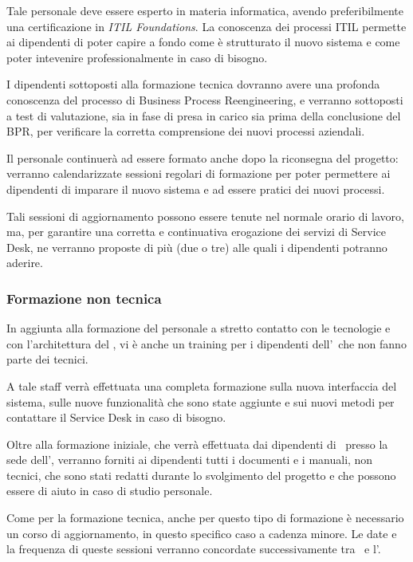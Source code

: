 			Tale personale deve essere esperto in materia informatica, avendo preferibilmente una certificazione in \textit{ITIL Foundations}.
			La conoscenza dei processi ITIL permette ai dipendenti di poter capire a fondo come è strutturato il nuovo sistema e come poter intevenire professionalmente in caso di bisogno.
			
			I dipendenti sottoposti alla formazione tecnica dovranno avere una profonda conoscenza del processo di Business Process Reengineering, e verranno sottoposti a test di valutazione, sia in fase di presa in carico sia prima della conclusione del BPR, per verificare la corretta comprensione dei nuovi processi aziendali.
			
			Il personale continuerà ad essere formato anche dopo la riconsegna del progetto: verranno calendarizzate sessioni regolari di formazione per poter permettere ai dipendenti di imparare il nuovo sistema e ad essere pratici dei nuovi processi.
			
			Tali sessioni di aggiornamento possono essere tenute nel normale orario di lavoro, ma, per garantire una corretta e continuativa erogazione dei servizi di Service Desk, ne verranno proposte di più (due o tre) alle quali i dipendenti potranno aderire.
			
		\subsubsection{Formazione non tecnica}
			
			In aggiunta alla formazione del personale a stretto contatto con le tecnologie e con l'architettura del \helpdesk, vi è anche un training per i dipendenti dell'\istituto~che non fanno parte dei tecnici.
			
			A tale staff verrà effettuata una completa formazione sulla nuova interfaccia del sistema, sulle nuove funzionalità che sono state aggiunte e sui nuovi metodi per contattare il Service Desk in caso di bisogno.
			
			Oltre alla formazione iniziale, che verrà effettuata dai dipendenti di \azienda~presso la sede dell'\istituto, verranno forniti ai dipendenti tutti i documenti e i manuali, non tecnici, che sono stati redatti durante lo svolgimento del progetto e che possono essere di aiuto in caso di studio personale.
			
			Come per la formazione tecnica, anche per questo tipo di formazione è necessario un corso di aggiornamento, in questo specifico caso a cadenza minore.
			Le date e la frequenza di queste sessioni verranno concordate successivamente tra \azienda~e l'\istituto.
		